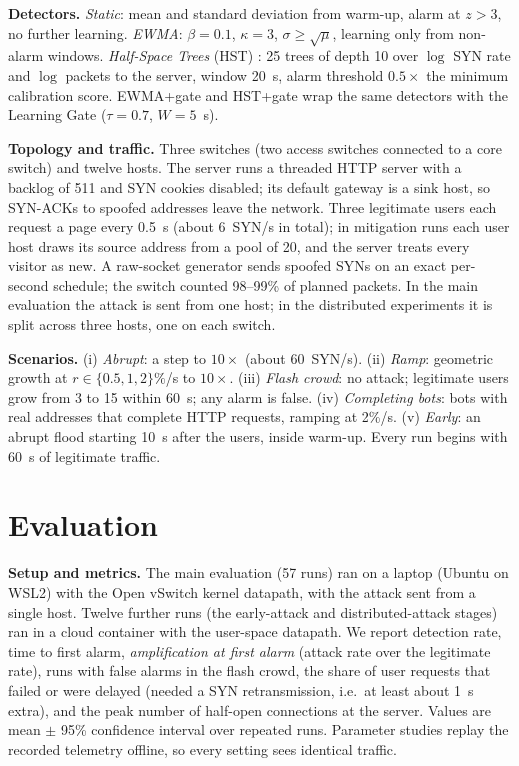 \documentclass[conference]{IEEEtran}
\begin{document}
\textbf{Detectors.} \emph{Static}: mean and standard deviation from warm-up, alarm at $z > 3$, no further learning. \emph{EWMA}: $\beta = 0.1$, $\kappa = 3$, $\sigma \ge \sqrt{\mu}$, learning only from non-alarm windows. \emph{Half-Space Trees} (HST) \cite{tan2011hst}: 25 trees of depth 10 over $\log$ SYN rate and $\log$ packets to the server, window 20~s, alarm threshold $0.5\times$ the minimum calibration score. EWMA+gate and HST+gate wrap the same detectors with the Learning Gate ($\tau = 0.7$, $W = 5$~s).

\textbf{Topology and traffic.} Three switches (two access switches connected to a core switch) and twelve hosts. The server runs a threaded HTTP server with a backlog of 511 and SYN cookies disabled; its default gateway is a sink host, so SYN-ACKs to spoofed addresses leave the network. Three legitimate users each request a page every 0.5~s (about 6~SYN/s in total); in mitigation runs each user host draws its source address from a pool of 20, and the server treats every visitor as new. A raw-socket generator sends spoofed SYNs on an exact per-second schedule; the switch counted 98--99\% of planned packets. In the main evaluation the attack is sent from one host; in the distributed experiments it is split across three hosts, one on each switch.

\textbf{Scenarios.} (i) \emph{Abrupt}: a step to $10\times$ (about 60~SYN/s). (ii) \emph{Ramp}: geometric growth at $r \in \{0.5, 1, 2\}\%$/s to $10\times$. (iii) \emph{Flash crowd}: no attack; legitimate users grow from 3 to 15 within 60~s; any alarm is false. (iv) \emph{Completing bots}: bots with real addresses that complete HTTP requests, ramping at 2\%/s. (v) \emph{Early}: an abrupt flood starting 10~s after the users, inside warm-up. Every run begins with 60~s of legitimate traffic.

\section{Evaluation}\label{sec:eval}
\textbf{Setup and metrics.} The main evaluation (57 runs) ran on a laptop (Ubuntu on WSL2) with the Open vSwitch kernel datapath, with the attack sent from a single host. Twelve further runs (the early-attack and distributed-attack stages) ran in a cloud container with the user-space datapath. We report detection rate, time to first alarm, \emph{amplification at first alarm} (attack rate over the legitimate rate), runs with false alarms in the flash crowd, the share of user requests that failed or were delayed (needed a SYN retransmission, i.e.\ at least about 1~s extra), and the peak number of half-open connections at the server. Values are mean $\pm$ 95\% confidence interval over repeated runs. Parameter studies replay the recorded telemetry offline, so every setting sees identical traffic.
\end{document}
